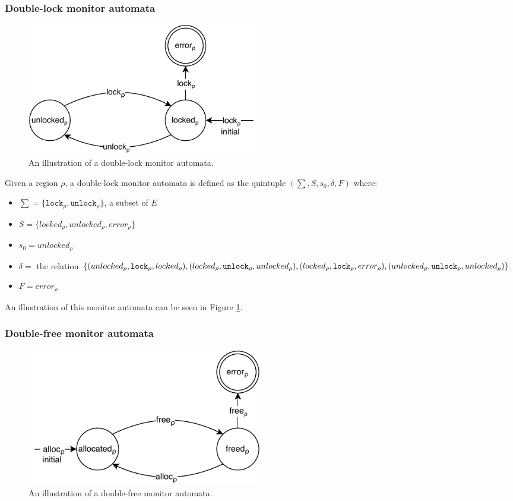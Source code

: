 \subsubsection{Double-lock monitor automata}

\begin{figure}[H]
    \centering
    \includegraphics[width=0.5\textwidth]{background/figures/double-lock}
    \caption{An illustration of a double-lock monitor automata.}
    \label{double-lock-automata}
\end{figure}

Given a region $\rho$, a double-lock monitor automata is defined as the quintuple $(\sum, S, s_0, \delta, F)$ where: 

\begin{itemize}
    \item $\sum = \{\texttt{lock}_\rho, \texttt{unlock}_\rho\}$, a subset of $E$
    \item $S = \{ locked_\rho, unlocked_\rho, error_\rho \}$
    \item $s_0 = unlocked_\rho$ 
    \item $\delta =$ the relation $\{(unlocked_\rho, \texttt{lock}_\rho, locked_\rho), (locked_\rho, \texttt{unlock}_\rho, unlocked_\rho), \\
    (locked_\rho, \texttt{lock}_\rho, error_\rho), (unlocked_\rho, \texttt{unlock}_\rho, unlocked_\rho)\}$ 
    \item $F = error_\rho$  
\end{itemize}

An illustration of this monitor automata can be seen in Figure \ref{double-lock-automata}. 

\subsubsection{Double-free monitor automata}

\begin{figure}[H]
    \centering
    \includegraphics[width=0.5\textwidth]{background/figures/double-free}
    \caption{An illustration of a double-free monitor automata.}
    \label{double-free-automata}
\end{figure}

